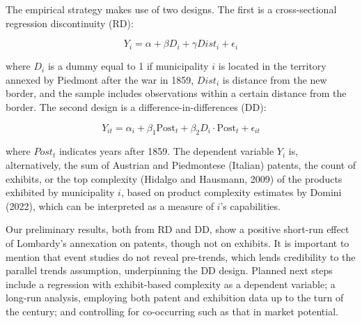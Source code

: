 The empirical strategy makes use of two designs. The first is a cross-sectional regression discontinuity (RD):

\begin{equation*}
    Y_{i} = \alpha + \beta D_i + \gamma Dist_i + \epsilon_i 
\end{equation*}

\noindent where $ D_i $ is a dummy equal to 1 if municipality $ i $ is located in the territory annexed by Piedmont after the war in 1859, $ Dist_i $ is distance from the new border, and the sample includes observations within a certain distance from the border. The second design is a difference-in-differences (DD):

\begin{equation*}
    Y_{it} = \alpha_i + \beta_1 \text{Post}_t + \beta_2 D_i \cdot \text{Post}_t + \epsilon_{it}
\end{equation*}

\noindent where $ Post_t $ indicates years after 1859. The dependent variable $ Y_i $ is, alternatively, the sum of Austrian and Piedmontese (Italian) patents, the count of exhibits, or the top complexity (Hidalgo and Hausmann, 2009) of the products exhibited by municipality $ i $, based on product complexity estimates by Domini (2022), which can be interpreted as a measure of $ i $'s capabilities.

Our preliminary results, both from RD and DD, show a positive short-run effect of Lombardy's annexation on patents, though not on exhibits. It is important to mention that event studies do not reveal pre-trends, which lends credibility to the parallel trends assumption, underpinning the DD design. Planned next steps include a regression with exhibit-based complexity as a dependent variable; a long-run analysis, employing both patent and exhibition data up to the turn of the century; and controlling for co-occurring such as that in market potential.  

